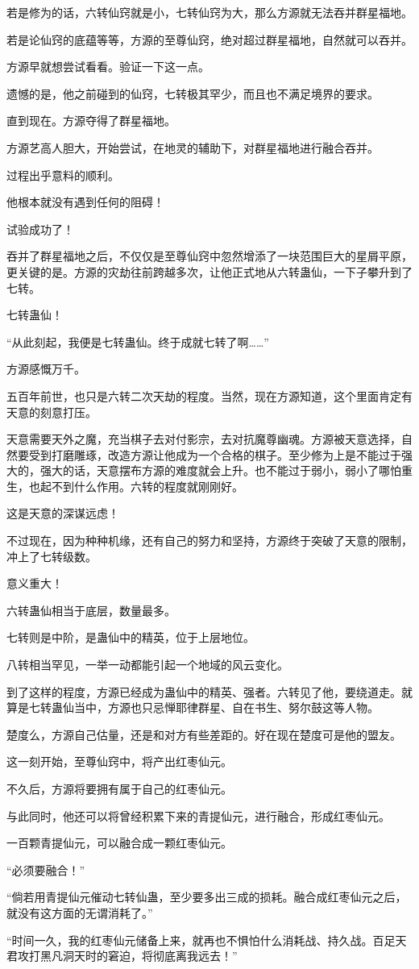 \begin{this_body}
若是修为的话，六转仙窍就是小，七转仙窍为大，那么方源就无法吞并群星福地。

若是论仙窍的底蕴等等，方源的至尊仙窍，绝对超过群星福地，自然就可以吞并。

方源早就想尝试看看。验证一下这一点。

遗憾的是，他之前碰到的仙窍，七转极其罕少，而且也不满足境界的要求。

直到现在。方源夺得了群星福地。

方源艺高人胆大，开始尝试，在地灵的辅助下，对群星福地进行融合吞并。

过程出乎意料的顺利。

他根本就没有遇到任何的阻碍！

试验成功了！

吞并了群星福地之后，不仅仅是至尊仙窍中忽然增添了一块范围巨大的星屑平原，更关键的是。方源的灾劫往前跨越多次，让他正式地从六转蛊仙，一下子攀升到了七转。

七转蛊仙！

“从此刻起，我便是七转蛊仙。终于成就七转了啊……”

方源感慨万千。

五百年前世，也只是六转二次天劫的程度。当然，现在方源知道，这个里面肯定有天意的刻意打压。

天意需要天外之魔，充当棋子去对付影宗，去对抗魔尊幽魂。方源被天意选择，自然要受到打磨雕琢，改造方源让他成为一个合格的棋子。至少修为上是不能过于强大的，强大的话，天意摆布方源的难度就会上升。也不能过于弱小，弱小了哪怕重生，也起不到什么作用。六转的程度就刚刚好。

这是天意的深谋远虑！

不过现在，因为种种机缘，还有自己的努力和坚持，方源终于突破了天意的限制，冲上了七转级数。

意义重大！

六转蛊仙相当于底层，数量最多。

七转则是中阶，是蛊仙中的精英，位于上层地位。

八转相当罕见，一举一动都能引起一个地域的风云变化。

到了这样的程度，方源已经成为蛊仙中的精英、强者。六转见了他，要绕道走。就算是七转蛊仙当中，方源也只忌惮耶律群星、自在书生、努尔鼓这等人物。

楚度么，方源自己估量，还是和对方有些差距的。好在现在楚度可是他的盟友。

这一刻开始，至尊仙窍中，将产出红枣仙元。

不久后，方源将要拥有属于自己的红枣仙元。

与此同时，他还可以将曾经积累下来的青提仙元，进行融合，形成红枣仙元。

一百颗青提仙元，可以融合成一颗红枣仙元。

“必须要融合！”

“倘若用青提仙元催动七转仙蛊，至少要多出三成的损耗。融合成红枣仙元之后，就没有这方面的无谓消耗了。”

“时间一久，我的红枣仙元储备上来，就再也不惧怕什么消耗战、持久战。百足天君攻打黑凡洞天时的窘迫，将彻底离我远去！”

\end{this_body}


